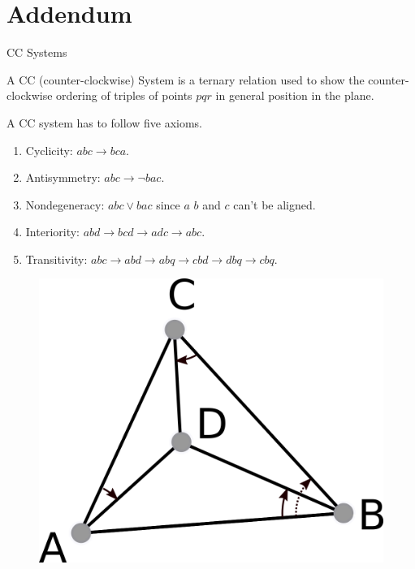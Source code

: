 \documentclass[18pt]{beamer}
\begin{document}
\section*{Addendum}

\begin{frame}{CC Systems}

  \begin{definition}
  A CC (counter-clockwise) System is a ternary relation used to show the counter-clockwise ordering of triples of points $pqr$ in general position in the plane.
  
 \end{definition}

\end{frame}


\begin{frame}

 A CC system has to follow five axioms.
\begin{enumerate}
\item<1-> Cyclicity: $abc \rightarrow bca$.
\item<2-> Antisymmetry: $abc\rightarrow \neg bac$.
\item<3-> Nondegeneracy: $abc \vee bac$ since $a$ $b$ and $c$ can't be aligned.
\item<4-> Interiority: $abd \rightarrow bcd \rightarrow adc \rightarrow abc$.
\item<5-> Transitivity: $ abc \rightarrow abd \rightarrow abq \rightarrow cbd \rightarrow dbq \rightarrow cbq $.
\end{enumerate}

\begin{overprint}
\begin{figure}
  \centering
  \includegraphics[scale=1.5]{Axiom4}


\end{figure}
\end{overprint}
\end{frame}
\end{document}
